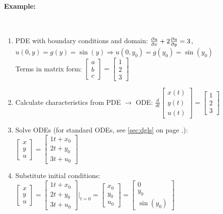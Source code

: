 \paragraph{Example:}~\\
\begin{enumerate}
	\item PDE with boundary conditions and domain: $\frac{\partial u}{\partial x}+2\frac{\partial u}{\partial y}=3$, \; $u(0,y)=g(y)=\sin(y) \Rightarrow u(0,y_0) = g(y_0) = \sin(y_0)$\\
	Terms in matrix form: $\begin{bmatrix}a\\b\\c\end{bmatrix}=\begin{bmatrix}1\\2\\3\end{bmatrix}$
	\item Calculate characteristics from PDE $\rightarrow$ ODE: $\frac {d}{dt}\begin{bmatrix}x(t)\\y(t)\\u(t)\end{bmatrix}=\begin{bmatrix}1\\2\\3\end{bmatrix}$
	\item Solve ODEs (for standard ODEs, see \ref{sec:dgls} on page \pageref{sec:dgls}.):
	$\begin{bmatrix}x\\y\\u\end{bmatrix}=\begin{bmatrix}1t+x_0\\2t+y_0\\3t+u_0\end{bmatrix}$
	\item Substitute initial conditions: $\begin{bmatrix}x\\y\\u\end{bmatrix}=\begin{bmatrix}1t+x_0\\2t+y_0\\3t+u_0\end{bmatrix}\Bigg|_{t=0}=
	\begin{bmatrix}x_0\\y_0\\u_0\end{bmatrix}=\begin{bmatrix}0\\y_0\\\sin(y_0)\end{bmatrix}$\\

\end{enumerate}
